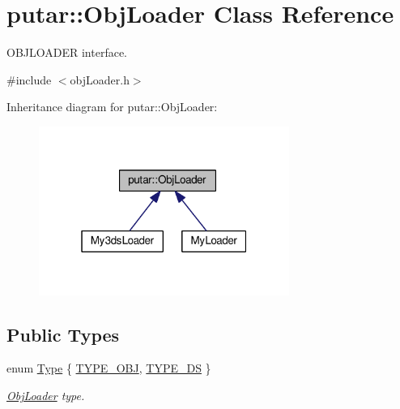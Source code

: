 \hypertarget{classputar_1_1ObjLoader}{}\section{putar\+:\+:Obj\+Loader Class Reference}
\label{classputar_1_1ObjLoader}


O\+B\+J\+L\+O\+A\+D\+ER interface.  




{\ttfamily \#include $<$obj\+Loader.\+h$>$}



Inheritance diagram for putar\+:\+:Obj\+Loader\+:
\nopagebreak
\begin{figure}[H]
\begin{center}
\leavevmode
\includegraphics[width=232pt]{classputar_1_1ObjLoader__inherit__graph}
\end{center}
\end{figure}
\subsection*{Public Types}
\begin{DoxyCompactItemize}
\item 
enum \hyperlink{classputar_1_1ObjLoader_a4891ad8bb46a1414e2e9f202c1552e09}{Type} \{ \hyperlink{classputar_1_1ObjLoader_a4891ad8bb46a1414e2e9f202c1552e09aa774f269e111384506b37b5409932f3f}{T\+Y\+P\+E\+\_\+\+O\+BJ}, 
\hyperlink{classputar_1_1ObjLoader_a4891ad8bb46a1414e2e9f202c1552e09a484712937d79e778fdb8ee77a104087f}{T\+Y\+P\+E\+\_\+DS}
 \}\begin{DoxyCompactList}\small\item\em \hyperlink{classputar_1_1ObjLoader}{Obj\+Loader} type. \end{DoxyCompactList}
\end{DoxyCompactItemize}
